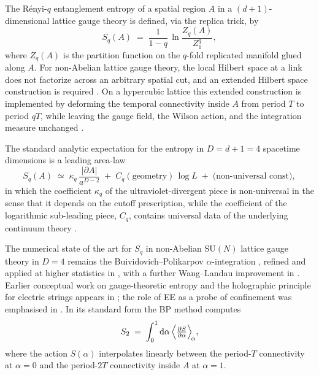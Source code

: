 \documentclass[11pt,a4paper]{article}
\theoremstyle{definition}
\newcommand{\dee}{\mathrm{d}}
\newcommand{\SUN}{\mathrm{SU}(N)}
\begin{document}
The Rényi-$q$ entanglement entropy of a spatial region $A$ in a
$(d+1)$-dimensional lattice gauge theory is defined, via the replica
trick, by
\begin{equation}
   S_{q}(A) \;=\; \frac{1}{1-q}\,\ln\!\frac{Z_{q}(A)}{Z_{1}^{q}},
   \label{eq:Renyi-def}
\end{equation}
where $Z_{q}(A)$ is the partition function on the $q$-fold replicated
manifold glued along $A$. For non-Abelian lattice gauge theory, the
local Hilbert space at a link does not factorize across an arbitrary
spatial cut, and an extended Hilbert space construction is required
\cite{Donnelly2012,Aoki2015}. On a hypercubic lattice this extended
construction is implemented by deforming the temporal connectivity
inside $A$ from period $T$ to period $qT$, while leaving the gauge
field, the Wilson action, and the integration measure unchanged
\cite{BP2008b}.

The standard analytic expectation for the entropy in $D = d+1 = 4$
spacetime dimensions is a leading area-law
\begin{equation}
   S_{q}(A) \;\simeq\; \kappa_{q}\,\frac{|\partial A|}{a^{D-2}}
                       \;+\; C_{q}(\text{geometry})\,\log L \;+\;
                       \text{(non-universal const)},
   \label{eq:arealaw-generic}
\end{equation}
in which the coefficient $\kappa_{q}$ of the ultraviolet-divergent
piece is non-universal in the sense that it depends on the cutoff
prescription, while the coefficient of the logarithmic sub-leading
piece, $C_{q}$, contains universal data of the underlying continuum
theory \cite{Solodukhin2011,CasiniHuerta2009}.

The numerical state of the art for $S_{q}$ in non-Abelian $\SUN$
lattice gauge theory in $D=4$ remains the Buividovich--Polikarpov
$\alpha$-integration \cite{BP2008b}, refined and applied at higher
statistics in \cite{Rabenstein2019}, with a further Wang--Landau
improvement in \cite{Rindlisbacher2022}. Earlier conceptual work on
gauge-theoretic entropy and the holographic principle for electric
strings appears in \cite{BP2008a,Velytsky2008}; the role of EE as a
probe of confinement was emphasised in \cite{KKM2007}. In its standard form the BP
method computes
\begin{equation}
   S_{2} \;=\; \int_{0}^{1} \dee\alpha\,
               \Bigl\langle \tfrac{\partial S}{\partial \alpha} \Bigr\rangle_{\!\alpha},
   \label{eq:FE-estimator-intro}
\end{equation}
where the action $S(\alpha)$ interpolates linearly between the
period-$T$ connectivity at $\alpha = 0$ and the period-$2T$
connectivity inside $A$ at $\alpha = 1$.
\end{document}
